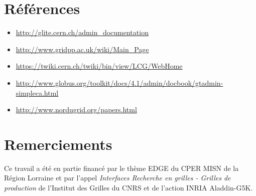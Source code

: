 \documentclass[a4paper,11pt]{article}
\begin{document}
\section{Références}
\begin{itemize}
\item \url{http://glite.cern.ch/admin_documentation}
\item \url{http://www.gridpp.ac.uk/wiki/Main_Page}
\item \url{https://twiki.cern.ch/twiki/bin/view/LCG/WebHome}
\item \url{http://www.globus.org/toolkit/docs/4.1/admin/docbook/gtadmin-simpleca.html}
\item \url{http://www.nordugrid.org/papers.html}
\end{itemize}


\section*{Remerciements}

Ce travail a été en partie financé par le thème EDGE du CPER MISN de la Région
Lorraine et par l'appel \textsl{Interfaces Recherche en grilles - Grilles de
production} de l'Institut des Grilles du CNRS et de l'action INRIA Aladdin-G5K.
\end{document}

